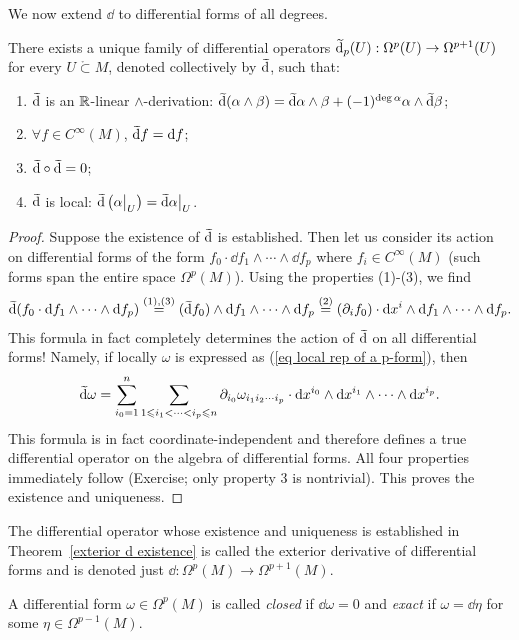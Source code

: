 We now extend $\dd$ to differential forms of all degrees.

\begin{thm}\label{exterior d existence}
    There exists a unique family of differential operators $\wt{\dd}_p(U):\Omega^p(U)\to \Omega^{p+1}(U)$ for every $U\mathring\subset M$, denoted collectively by $\wt\dd$, such that:
\begin{enumerate}
    \item $\wt\dd$ is an $\mathbb{R} $-linear $\wedge$-derivation: $\wt\dd(\alpha\wedge\beta)=\wt\dd\alpha\wedge\beta+(-1)^{\deg\alpha}\alpha\wedge\wt\dd\beta$;
    \item $\forall f\in C^\infty(M)$, $\wt\dd f=\dd f$;
    \item $\wt\dd\circ\wt\dd=0$;
    \item $\wt\dd$ is local: $\wt\dd\left(\restr{\alpha}{U}\right)=\restr{\wt\dd\alpha}{U}$.
\end{enumerate}
\end{thm}
\begin{proof}
Suppose the existence of $\wt\dd$ is established. Then let us consider its action on differential forms of the form $f_0\cdot \dd f_1\wedge \cdots \wedge \dd f_p$ where $f_i\in C^\infty(M)$ (such forms span the entire space $\Omega^p(M)$). Using the properties (1)-(3), we find
\[\wt\dd (f_0\cdot \dd f_1\wedge \cdots \wedge \dd f_p)\overset{(1),(3)}{=}(\wt\dd f_0) \wedge \dd f_1\wedge \cdots \wedge \dd f_p\overset{(2)}{=}(\partial_i f_0)\cdot \dd x^i\wedge \dd f_1\wedge \cdots \wedge \dd f_p.\]
This formula in fact completely determines the action of $\wt\dd$ on all differential forms! Namely, if locally $\omega$ is expressed as (\ref{eq local rep of a p-form}), then
\[\wt\dd \omega =\sum_{i_0=1}^n\sum_{1\leq i_1<\cdots <i_p\leq n}\partial_{i_0}\omega_{i_1 i_2\cdots i_p}\cdot \dd x^{i_0}\wedge \dd x^{i_1}\wedge\cdots\wedge \dd x^{i_p}.\label{eq local formula for d}\]
This formula is in fact coordinate-independent and therefore defines a true differential operator on the algebra of differential forms. All four properties immediately follow (Exercise; only property 3 is nontrivial). This proves the existence and uniqueness.
\end{proof}

\begin{defn}
    The differential operator whose existence and uniqueness is established in Theorem~\ref{exterior d existence} is called the exterior derivative of differential forms and is denoted just $\dd:\Omega^p(M)\to\Omega^{p+1}(M)$.

    A differential form $\omega\in\Omega^p(M)$ is called \emph{closed} if $\dd\omega=0$ and \emph{exact} if $\omega=\dd\eta$ for some $\eta\in\Omega^{p-1}(M)$. 
\end{defn}

